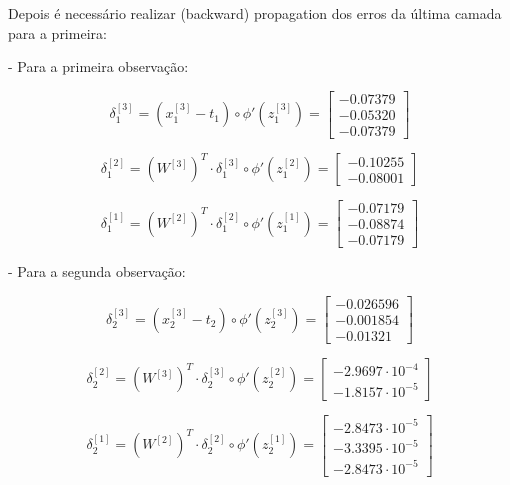 \documentclass[a4paper,12pt]{article} %
\begin{document}
\begin{enumerate}
Depois é necessário realizar (backward) propagation dos erros da última camada para a primeira:

- Para a primeira observação:

\begin{equation*}
    \delta^{[3]}_1 = (x^{[3]}_1 - t_1) \circ \phi'(z^{[3]}_1) = \begin{bmatrix} -0.07379 \\ -0.05320 \\ -0.07379 \end{bmatrix}
\end{equation*}

\begin{equation*}
    \delta^{[2]}_1 = (W^{[3]})^T \cdot \delta^{[3]}_1 \circ \phi'(z^{[2]}_1) = \begin{bmatrix} -0.10255 \\ -0.08001 \end{bmatrix}
\end{equation*}

\begin{equation*}
    \delta^{[1]}_1 = (W^{[2]})^T \cdot \delta^{[2]}_1 \circ \phi'(z^{[1]}_1) = \begin{bmatrix} -0.07179 \\ -0.08874 \\ -0.07179 \end{bmatrix}
\end{equation*}

- Para a segunda observação:

\begin{equation*}
    \delta^{[3]}_2 = (x^{[3]}_2 - t_2) \circ \phi'(z^{[3]}_2) = \begin{bmatrix} -0.026596 \\ -0.001854 \\ -0.01321 \end{bmatrix}
\end{equation*}

\begin{equation*}
    \delta^{[2]}_2 = (W^{[3]})^T \cdot \delta^{[3]}_2 \circ \phi'(z^{[2]}_2) = \begin{bmatrix} -2.9697\cdot 10^{-4} \\ -1.8157\cdot 10^{-5} \end{bmatrix}
\end{equation*}

\begin{equation*}
    \delta^{[1]}_2 = (W^{[2]})^T \cdot \delta^{[2]}_2 \circ \phi'(z^{[1]}_2) = \begin{bmatrix} -2.8473\cdot 10^{-5} \\ -3.3395\cdot 10^{-5} \\ -2.8473\cdot 10^{-5} \end{bmatrix}
\end{equation*}


\end{enumerate}
\end{document}
